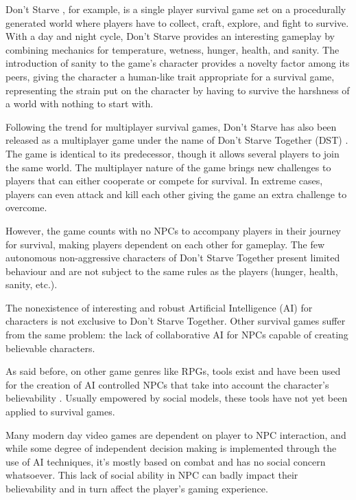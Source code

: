 Don't Starve \cite{games:dontstarve}, for example, is a single player survival game set on a procedurally generated world where players have to collect, craft, explore, and fight to survive.
With a day and night cycle, Don't Starve provides an interesting gameplay by combining mechanics for temperature, wetness, hunger, health, and sanity.
The introduction of sanity to the game's character provides a novelty factor among its peers, giving the character a human-like trait appropriate for a survival game, representing the strain put on the character by having to survive the harshness of a world with nothing to start with.

Following the trend for multiplayer survival games, Don't Starve has also been released as a multiplayer game under the name of Don't Starve Together (DST) \cite{games:dontstarvetogether}.
The game is identical to its predecessor, though it allows several players to join the same world.
The multiplayer nature of the game brings new challenges to players that can either cooperate or compete for survival.
In extreme cases, players can even attack and kill each other giving the game an extra challenge to overcome.

However, the game counts with no NPCs to accompany players in their journey for survival, making players dependent on each other for gameplay.
The few autonomous non-aggressive characters of Don't Starve Together present limited behaviour and are not subject to the same rules as the players (hunger, health, sanity, etc.).

The nonexistence of interesting and robust Artificial Intelligence (AI) for characters is not exclusive to Don't Starve Together.
Other survival games suffer from the same problem: the lack of collaborative AI for NPCs capable of creating believable characters.

As said before, on other game genres like RPGs, tools exist and have been used for the creation of AI controlled NPCs that take into account the character's believability \cite{guimaraes:cif-ck}\cite{afonso:agents-that-relate}\cite{ferreira:merchant-model}.
Usually empowered by social models, these tools have not yet been applied to survival games.

Many modern day video games are dependent on player to NPC interaction, and while
some degree of independent decision making is implemented through the use of AI techniques, it’s mostly based on combat and has no social concern whatsoever.
This lack of social ability in NPC can badly impact their believability and in turn affect the player's gaming experience.

